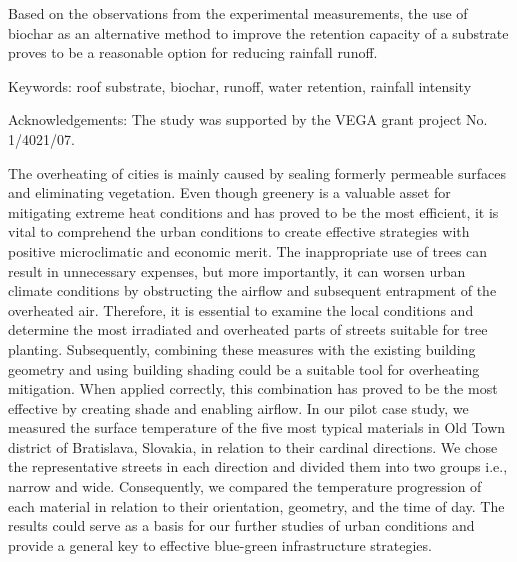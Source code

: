 Based on the observations from the experimental measurements, the use of biochar as an alternative method to improve the retention capacity of a substrate proves to be a reasonable option for reducing rainfall runoff.

Keywords: roof substrate, biochar, runoff, water retention, rainfall intensity 

Acknowledgements:
The study was supported by the VEGA grant project No. 1/4021/07.



\newpage{}
{}
\begin{flushleft}





\end{flushleft}

\noindent

The overheating of cities is mainly caused by sealing formerly permeable surfaces and eliminating vegetation. Even though greenery is a valuable asset for mitigating extreme heat conditions and has proved to be the most efficient, it is vital to comprehend the urban conditions to create effective strategies with positive microclimatic and economic merit. The inappropriate use of trees can result in unnecessary expenses, but more importantly, it can worsen urban climate conditions by obstructing the airflow and subsequent entrapment of the overheated air. Therefore, it is essential to examine the local conditions and determine the most irradiated and overheated parts of streets suitable for tree planting. Subsequently, combining these measures with the existing building geometry and using building shading could be a suitable tool for overheating mitigation. When applied correctly, this combination has proved to be the most effective by creating shade and enabling airflow. In our pilot case study, we measured the surface temperature of the five most typical materials in Old Town district of Bratislava, Slovakia, in relation to their cardinal directions. We chose the representative streets in each direction and divided them into two groups i.e., narrow and wide. Consequently, we compared the temperature progression of each material in relation to their orientation, geometry, and the time of day. The results could serve as a basis for our further studies of urban conditions and provide a general key to effective blue-green infrastructure strategies.

